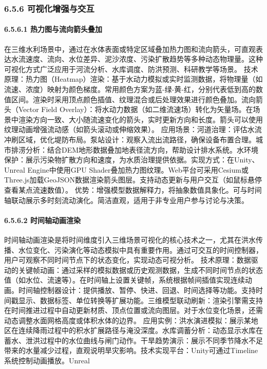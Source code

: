{{{{{{{{{{\subsubsection{6.5.6 可视化增强与交互}\label{ux53efux89c6ux5316ux589eux5f3aux4e0eux4ea4ux4e92} \paragraph{6.5.6.1
热力图与流向箭头叠加}\label{ux70edux529bux56feux4e0eux6d41ux5411ux7badux5934ux53e0ux52a0}
在三维水利场景中，通过在水体表面或特定区域叠加热力图和流向箭头，可直观表达水流速度、流向、水位差异、泥沙浓度、污染扩散趋势等多种动态物理量。这种可视化方式广泛应用于河流分析、水库调度、防洪预测、科研教学等场景。
技术原理：热力图（Heatmap）渲染：基于水动力模拟或实时监测数据，将物理量（如流速、浓度）映射为颜色梯度。常用颜色方案为蓝-绿-黄-红，分别代表低到高的数值区间。渲染时采用顶点颜色插值、纹理混合或后处理效果进行颜色叠加。流向箭头（Vector
Field Overlay）：将水动力数据（如二维流速场）转化为矢量场。在场景中渲染方向一致、大小随流速变化的箭头，实时更新方向和长度。箭头可以使用纹理动画增强流动感（如箭头滚动或伸缩效果）。
应用场景：河道治理：评估水流冲刷区域，优化堤防布局。泵站设计：观察入流出流路径，确保设备布置合理。城市排涝分析：结合DEM地形数据叠加地表径流方向，帮助设计排水系统。水环境保护：展示污染物扩散方向和速度，为水质治理提供依据。实现方式：在Unity、Unreal
Engine中使用GPU Shader叠加热力图纹理。Web平台可采用Cesium或Three.js加载GeoJSON数据渲染箭头图层。支持动态更新与用户交互（如鼠标悬停查看某点流速数值）。
优势：增强模型数据解释力，将抽象数值具象化。可与时间轴联动展示多时刻流动演化。简洁直观，适用于非专业用户参与讨论与决策。 \paragraph{6.5.6.2
时间轴动画渲染}\label{ux65f6ux95f4ux8f74ux52a8ux753bux6e32ux67d3}
时间轴动画渲染是将时间维度引入三维场景可视化的核心技术之一，尤其在洪水传播、水位变化、污染演化等动态模拟中具有重要作用。通过可交互的时间控制器，用户可观察不同时间节点下的状态变化，实现动态可视分析。
技术原理：数据驱动的关键帧动画：通过采样的模拟数据或历史观测数据，生成不同时间节点的状态值（如水位、流速等）。在时间轴上设置关键帧，系统根据帧间插值实现连续动画。时间轴控制器设计：提供播放、暂停、快进、回退、时间选择等功能。支持时间戳显示、数据标签、单位转换等扩展功能。三维模型联动刷新：渲染引擎需支持在时间推进过程中自动更新材质、顶点位置或流向图层。对于水位变化场景，还需动态调整水面网格高度或体积水体的边界。
应用实例：洪水演进模拟：展示某地区在连续降雨过程中的积水扩展路径与淹没深度。水库调蓄分析：动态显示水库在蓄水、泄洪过程中的水位曲线与闸门动作。干旱趋势演示：展示不同季节降水不足带来的水量减少过程，直观说明旱灾影响。技术实现平台：Unity可通过Timeline系统控制动画播放。Unreal
}}}}}}}}}}
